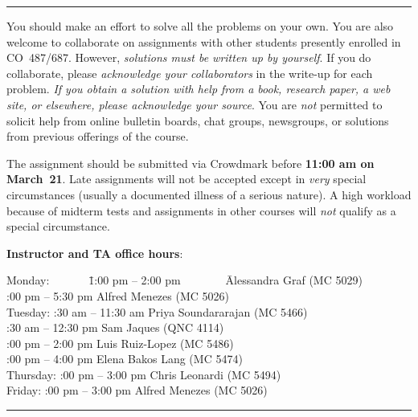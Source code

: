\documentclass[11pt]{article}
\begin{document}
\hfill\hrule

\vspace*{2mm}
\noindent
You should make an effort to solve all the problems on your own.
You are also welcome to collaborate on assignments with other students
presently enrolled in CO~487/687. However, \emph{solutions must be
written up by yourself}. If you do collaborate, please \emph{acknowledge
your collaborators} in the write-up for each problem. \emph{If you
obtain a solution with help from a book, research paper, a web site,
or elsewhere, please acknowledge your source}. You are \emph{not}
permitted to solicit help from online bulletin boards, chat groups,
newsgroups, or solutions from previous offerings of the course.

\vspace*{2mm}
\noindent
The assignment should be submitted via Crowdmark before {\bf 11:00 am
on March~21}. Late assignments will not be accepted except in
\emph{very} special circumstances (usually a documented illness of
a serious nature). A high workload because of midterm tests and assignments
in other courses will \emph{not} qualify as a special circumstance.

\vspace*{4mm}
\noindent
{\bf Instructor and TA office hours}:
\begin{tabbing}
Monday:~~~~~~~\=1:00 pm -- 2:00 pm~~~~~~~~\= Alessandra Graf (MC 5029)\\
:00 pm -- 5:30 pm \> Alfred Menezes (MC 5026)\\
Tuesday: :30 am -- 11:30 am \> Priya Soundararajan (MC 5466)\\
:30 am -- 12:30 pm \> Sam Jaques (QNC 4114)\\
:00 pm -- 2:00 pm \> Luis Ruiz-Lopez (MC 5486)\\
:00 pm -- 4:00 pm \> Elena Bakos Lang (MC 5474)\\
Thursday: :00 pm -- 3:00 pm \> Chris Leonardi (MC 5494)\\
Friday: :00 pm -- 3:00 pm \> Alfred Menezes (MC 5026)
\end{tabbing}

\hfill\hrule
\end{document}
